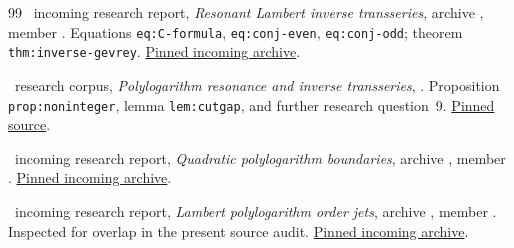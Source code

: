 \begin{thebibliography}{99}
\repo\ incoming research report, \emph{Resonant Lambert inverse
transseries}, archive
,
member .
Equations \texttt{eq:C-formula}, \texttt{eq:conj-even},
\texttt{eq:conj-odd}; theorem \texttt{thm:inverse-gevrey}.
\href{https://github.com/VladimirReshetnikov/ProveIt/blob/8f5afd4d7565df808359f6a0c22f87f79a119bb9/docs/incoming/Resonant_Lambert_Inverse_Transseries_2026-10-12.zip}{Pinned incoming archive}.

\repo\ research corpus, \emph{Polylogarithm resonance and inverse
transseries},
.
Proposition \texttt{prop:noninteger}, lemma \texttt{lem:cutgap},
and further research question~9.
\href{https://github.com/VladimirReshetnikov/ProveIt/blob/8f5afd4d7565df808359f6a0c22f87f79a119bb9/Analysis/Transseries/docs/series-and-transseries/Polylogarithm_Resonance_And_Inverse_Transseries/polylogarithm_resonance_and_inverse_transseries.tex}{Pinned source}.

\repo\ incoming research report,
\emph{Quadratic polylogarithm boundaries}, archive
,
member .
\href{https://github.com/VladimirReshetnikov/ProveIt/blob/8f5afd4d7565df808359f6a0c22f87f79a119bb9/docs/incoming/ProveIt_Quadratic_Polylog_Boundaries_2026-10-12.zip}{Pinned incoming archive}.

\repo\ incoming research report,
\emph{Lambert polylogarithm order jets}, archive
,
member .
Inspected for overlap in the present source audit.
\href{https://github.com/VladimirReshetnikov/ProveIt/blob/8f5afd4d7565df808359f6a0c22f87f79a119bb9/docs/incoming/ProveIt_Lambert_Polylog_Order_Jets_2026-10-12.zip}{Pinned incoming archive}.
\end{thebibliography}
